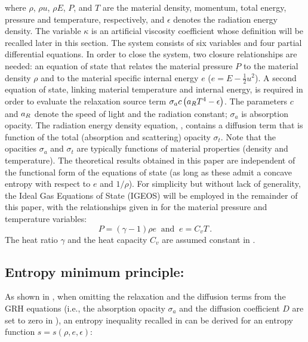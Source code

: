 \documentclass[times,doublespace]{fldauth}%
\begin{document}
%
where $\rho$, $\rho u$, $\rho E$, $P$, and $T$ are the material density, momentum, total energy, pressure and temperature, respectively, and $\epsilon$ denotes the radiation energy density. The variable $\kappa$ is an artificial viscosity coefficient whose definition will be recalled later in this section. 
The system consists of six variables and four partial differential equations. In order to close the system, two closure relationships are needed:  
an equation of state that relates the material pressure $P$ to the material density $\rho$ and to the 
material specific internal energy $e$ ($e = E - \tfrac 1 2 u^2$). A second equation of state, linking material temperature 
and internal energy, is required in order to evaluate the relaxation source term $\sigma_a c \left( a_R T^4 - \epsilon \right)$.
The parameters $c$ and $a_R$ denote the speed of light and the radiation constant; $\sigma_a$ is absorption opacity. 
The radiation energy density equation, , contains a diffusion term that is function of the 
total (absorption and scattering) opacity $\sigma_t$. Note that the opacities $\sigma_a$ and $\sigma_t$ are typically functions of 
material properties (density and temperature). 
The theoretical results obtained in this paper are independent of the functional form of the equations of state 
(as long as these admit a concave entropy with respect to $e$ and $1/ \rho$). For simplicity but without lack of generality, the Ideal Gas Equations of State
(IGEOS) will be employed in the remainder of this paper, with the relationships given in  for the material pressure and temperature variables:
%
\begin{equation}\label{eq:IGEOS}
P = (\gamma-1) \rho e \ \text{  and  } \ e = C_v T \, .
\end{equation}
%
The heat ratio $\gamma$ and the heat capacity $C_v$ are assumed constant in .
%
\subsection{Entropy minimum principle:}\label{sec:ent-min}
%
As shown in \cite{our_jcp_radhy_paper}, when omitting the relaxation and the diffusion terms from the GRH equations (i.e., the absorption opacity $\sigma_a$ and the diffusion coefficient $D$ are set to zero in ), an entropy inequality recalled in  can be derived for an entropy function $s=s(\rho, e, \epsilon)$:
\end{document}
